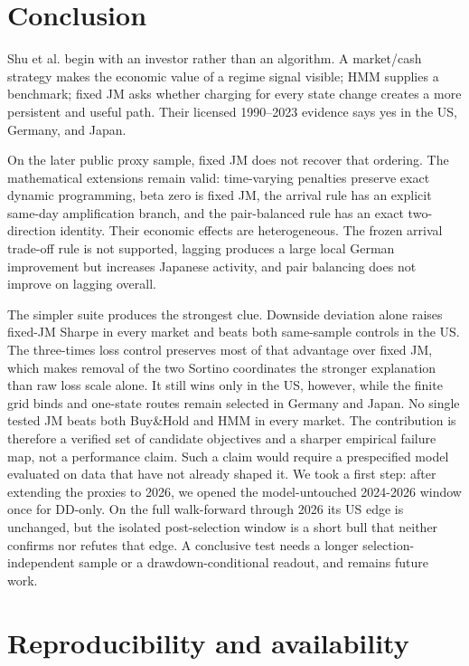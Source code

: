 \documentclass[11pt]{article}
\newcommand{\BH}{Buy\&Hold}
\begin{document}
\section{Conclusion}

Shu et al. begin with an investor rather than an algorithm. A market/cash
strategy makes the economic value of a regime signal visible; HMM supplies a
benchmark; fixed JM asks whether charging for every state change creates a more
persistent and useful path. Their licensed 1990--2023 evidence says yes in the
US, Germany, and Japan.

On the later public proxy sample, fixed JM does not recover that ordering. The
mathematical extensions remain valid: time-varying penalties preserve exact
dynamic programming, beta zero is fixed JM, the arrival rule has an explicit
same-day amplification branch, and the pair-balanced rule has an exact
two-direction identity. Their economic effects are heterogeneous. The frozen
arrival trade-off rule is not supported, lagging produces a large local German
improvement but increases Japanese activity, and pair balancing does not
improve on lagging overall.

The simpler suite produces the strongest clue. Downside deviation alone raises
fixed-JM Sharpe in every market and beats both same-sample controls in the US.
The three-times loss control preserves most of that advantage over fixed JM,
which makes removal of the two Sortino coordinates the stronger explanation
than raw loss scale alone. It still wins only in the US, however, while the
finite grid binds and one-state routes remain selected in Germany and Japan.
No single tested JM beats both \BH{} and HMM in every market. The contribution
is therefore a verified set of candidate objectives and a sharper empirical
failure map, not a performance claim. Such a claim would require a
prespecified model evaluated on data that have not already shaped it. We took a
first step: after extending the proxies to 2026, we opened the model-untouched
2024-2026 window once for DD-only. On the full walk-forward through 2026 its US
edge is unchanged, but the isolated post-selection window is a short bull that
neither confirms nor refutes that edge. A conclusive test needs a longer
selection-independent sample or a drawdown-conditional readout, and remains
future work.

\appendix
\section{Reproducibility and availability}
\end{document}
